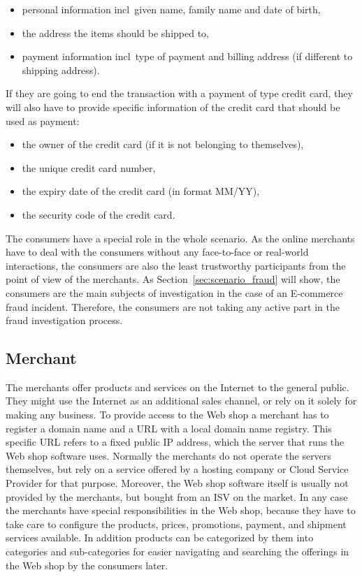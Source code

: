 \begin{itemize}
		\item personal information \gls{incl}\ given name, family name and date of birth,
		\item the address the items should be shipped to,
		\item payment information \gls{incl}\ type of payment and billing address (if different to shipping address).
\end{itemize}

If they are going to end the transaction with a payment of type credit card, they will also have to provide specific information of the credit card that should be used as payment:\@

\begin{itemize}
		\item the owner of the credit card (if it is not belonging to themselves),
		\item the unique credit card number,
		\item the expiry date of the credit card (in format MM/YY),
		\item the security code of the credit card.
\end{itemize}

The consumers have a special role in the whole scenario. As the online merchants have to deal with the consumers without any face-to-face or real-world interactions, the consumers are also the least trustworthy participants from the point of view of the merchants. As Section~\ref{sec:scenario_fraud} will show, the consumers are the main subjects of investigation in the case of an \gls{E-commerce} fraud incident. Therefore, the consumers are not taking any active part in the fraud investigation process.


\subsection{Merchant}
\label{subsec:stakeholder_merchant}

The merchants offer products and services on the Internet to the general public. They might use the Internet as an additional sales channel, or rely on it solely for making any business. To provide access to the Web shop a merchant has to register a domain name and a \gls{URL} with a local domain name registry. This specific \gls{URL} refers to a fixed public \gls{IP} address, which the server that runs the Web shop software uses. Normally the merchants do not operate the servers themselves, but rely on a service offered by a hosting company or Cloud Service Provider for that purpose. Moreover, the Web shop software itself is usually not provided by the merchants, but bought from an \gls{ISV} on the market. In any case the merchants have special responsibilities in the Web shop, because they have to take care to configure the products, prices, promotions, payment, and shipment services available. In addition products can be categorized by them into categories and sub-categories for easier navigating and searching the offerings in the Web shop by the consumers later. \\


